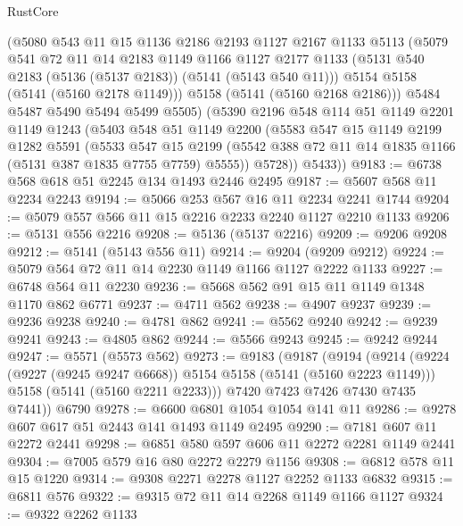 \begin{lexlean}{RustCore}
\begin{coremodule}
        (@5080
          @543
          @11
          @15
          @1136
          @2186
          @2193
          @1127
          @2167
          @1133
          @5113
          (@5079
            @541
            @72
            @11
            @14
            @2183
            @1149
            @1166
            @1127
            @2177
            @1133
            (@5131 @540 @2183 (@5136 (@5137 @2183)) (@5141 (@5143 @540 @11)))
            @5154
            @5158
            (@5141 (@5160 @2178 @1149)))
          @5158
          (@5141 (@5160 @2168 @2186)))
        @5484
        @5487
        @5490
        @5494
        @5499
        @5505)
      (@5390
        @2196
        @548
        @114
        @51
        @1149
        @2201
        @1149
        @1243
        (@5403
          @548
          @51
          @1149
          @2200
          (@5583
            @547
            @15
            @1149
            @2199
            @1282
            @5591
            (@5533
              @547
              @15
              @2199
              (@5542 @388 @72 @11 @14 @1835 @1166 (@5131 @387 @1835 @7755 @7759) @5555))
            @5728))
        @5433))
@9183 := @6738 @568 @618 @51 @2245 @134 @1493 @2446 @2495
@9187 := @5607 @568 @11 @2234 @2243
@9194 := @5066 @253 @567 @16 @11 @2234 @2241 @1744
@9204 := @5079 @557 @566 @11 @15 @2216 @2233 @2240 @1127 @2210 @1133
@9206 := @5131 @556 @2216
@9208 := @5136 (@5137 @2216)
@9209 := @9206 @9208
@9212 := @5141 (@5143 @556 @11)
@9214 := @9204 (@9209 @9212)
@9224 := @5079 @564 @72 @11 @14 @2230 @1149 @1166 @1127 @2222 @1133
@9227 := @6748 @564 @11 @2230
@9236 := @5668 @562 @91 @15 @11 @1149 @1348 @1170 @862 @6771
@9237 := @4711 @562
@9238 := @4907 @9237
@9239 := @9236 @9238
@9240 := @4781 @862
@9241 := @5562 @9240
@9242 := @9239 @9241
@9243 := @4805 @862
@9244 := @5566 @9243
@9245 := @9242 @9244
@9247 := @5571 (@5573 @562)
@9273 := @9183
    (@9187
      (@9194
        (@9214
          (@9224 (@9227 (@9245 @9247 @6668)) @5154 @5158 (@5141 (@5160 @2223 @1149)))
          @5158
          (@5141 (@5160 @2211 @2233)))
        @7420
        @7423
        @7426
        @7430
        @7435
        @7441))
    @6790
@9278 := @6600 @6801 @1054 @1054 @141 @11
@9286 := @9278 @607 @617 @51 @2443 @141 @1493 @1149 @2495
@9290 := @7181 @607 @11 @2272 @2441
@9298 := @6851 @580 @597 @606 @11 @2272 @2281 @1149 @2441
@9304 := @7005 @579 @16 @80 @2272 @2279 @1156
@9308 := @6812 @578 @11 @15 @1220
@9314 := @9308 @2271 @2278 @1127 @2252 @1133 @6832
@9315 := @6811 @576
@9322 := @9315 @72 @11 @14 @2268 @1149 @1166 @1127
@9324 := @9322 @2262 @1133

\end{coremodule}
\end{lexlean}
